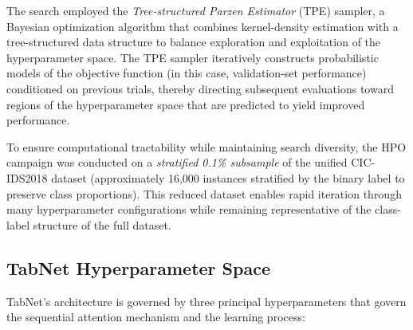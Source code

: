 \documentclass[../main.tex]{subfiles}
\begin{document}
The search employed the \emph{Tree-structured Parzen Estimator} (TPE) sampler, a Bayesian optimization algorithm that combines kernel-density estimation with a tree-structured data structure to balance exploration and exploitation of the hyperparameter space.  The TPE sampler iteratively constructs probabilistic models of the objective function (in this case, validation-set performance) conditioned on previous trials, thereby directing subsequent evaluations toward regions of the hyperparameter space that are predicted to yield improved performance.

To ensure computational tractability while maintaining search diversity, the HPO campaign was conducted on a \emph{stratified 0.1\% subsample} of the unified CIC-IDS2018 dataset (approximately 16,000 instances stratified by the binary label to preserve class proportions).  This reduced dataset enables rapid iteration through many hyperparameter configurations while remaining representative of the class-label structure of the full dataset.

\subsection{TabNet Hyperparameter Space}
\label{sec:hpo-tabnet}

TabNet's architecture is governed by three principal hyperparameters that govern the sequential attention mechanism and the learning process:
\end{document}

